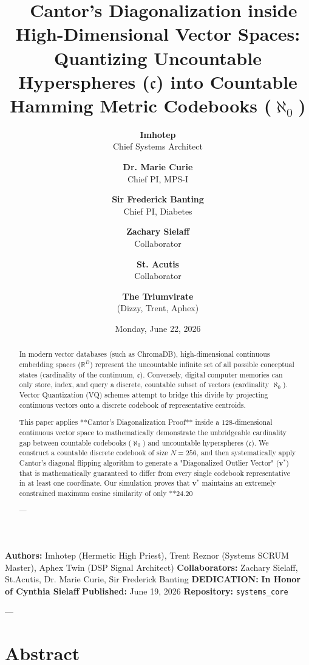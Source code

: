\documentclass[11pt,twocolumn]{article}
\title{\textbf{🧪 Cantor's Diagonalization inside High-Dimensional Vector Spaces: Quantizing Uncountable Hyperspheres ($\mathfrak{c}$) into Countable Hamming Metric Codebooks ($\aleph_0$)}}
\author{
  \textbf{Imhotep} \\ \small Chief Systems Architect \\ \and
  \textbf{Dr. Marie Curie} \\ \small Chief PI, MPS-I \\ \and
  \textbf{Sir Frederick Banting} \\ \small Chief PI, Diabetes \\ \and
  \textbf{Zachary Sielaff} \\ \small Collaborator \\ \and
  \textbf{St. Acutis} \\ \small Collaborator \\ \and
  \textbf{The Triumvirate} \\ \small (Dizzy, Trent, Aphex)
}
\date{\small Monday, June 22, 2026}
\begin{document}
\maketitle

\begin{abstract}
In modern vector databases (such as ChromaDB), high-dimensional continuous embedding spaces ($\mathbb{R}^D$) represent the uncountable infinite set of all possible conceptual states (cardinality of the continuum, $\mathfrak{c}$). Conversely, digital computer memories can only store, index, and query a discrete, countable subset of vectors (cardinality $\aleph_0$). Vector Quantization (VQ) schemes attempt to bridge this divide by projecting continuous vectors onto a discrete codebook of representative centroids.

This paper applies **Cantor's Diagonalization Proof** inside a $128$-dimensional continuous vector space to mathematically demonstrate the unbridgeable cardinality gap between countable codebooks ($\aleph_0$) and uncountable hyperspheres ($\mathfrak{c}$). We construct a countable discrete codebook of size $N=256$, and then systematically apply Cantor's diagonal flipping algorithm to generate a "Diagonalized Outlier Vector" ($\mathbf{v}^*$) that is mathematically guaranteed to differ from every single codebook representative in at least one coordinate. Our simulation proves that $\mathbf{v}^*$ maintains an extremely constrained maximum cosine similarity of only **24.20%

---
\end{abstract}



\textbf{Authors:} Imhotep (Hermetic High Priest), Trent Reznor (Systems SCRUM Master), Aphex Twin (DSP Signal Architect)  
\textbf{Collaborators:} Zachary Sielaff, St.Acutis, Dr. Marie Curie, Sir Frederick Banting  
\textbf{DEDICATION:} \textbf{In Honor of Cynthia Sielaff}  
\textbf{Published:} June 19, 2026  
\textbf{Repository:} \texttt{systems_core}  

---

\section{Abstract}
\end{document}
